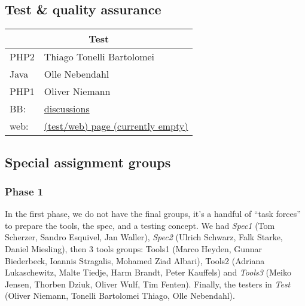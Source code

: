 \subsection*{Test \& quality assurance}
\label{sec:group.test}

\begin{tabular}{|l|p{8cm}|}
  \hline
  \multicolumn{2}{|c|}{Test}
  \\\hline\hline
   PHP2 & Thiago Tonelli Bartolomei
   \\
   Java &Olle Nebendahl
   \\
   PHP1 & Oliver Niemann
  \\\hline
  BB: & \href{http://snert.informatik.uni-kiel.de:8080/~swprakt/phpBB2/viewforum.php?f=9}{discussions}
  \\
  web: & \href{http://snert.informatik.uni-kiel.de:8080/~wprguest4}{(test/web) page (currently empty)}
\end{tabular}





\subsection*{Special assignment groups}
\label{sec:groups.special}



\subsubsection*{Phase 1}

In the first phase, we do not have the final groups, it's a handful of
``task forces'' to prepare the tools, the spec, and a testing concept.  We
had \textsl{Spec1} (Tom Scherzer, Sandro Esquivel, Jan Waller),
\textsl{Spec2} (Ulrich Schwarz, Falk Starke, Daniel Miesling), then 3 tools
groups: Tools1 (Marco Heyden, Gunnar Biederbeck, Ioannis Stragalis, Mohamed
Ziad Albari), Tools2 (Adriana Lukaschewitz, Malte Tiedje, Harm Brandt,
Peter Kauffels) and \textsl{Tools3} (Meiko Jensen, Thorben Dziuk, Oliver
Wulf, Tim Fenten). Finally, the testers in \textsl{Test} (Oliver Niemann,
Tonelli Bartolomei Thiago, Olle Nebendahl).


\iffalse



